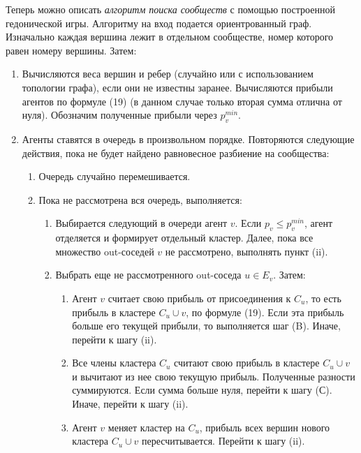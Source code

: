 Теперь можно описать \textit{алгоритм поиска сообществ} с помощью построенной гедонической игры. Алгоритму на вход подается ориентрованный граф. Изначально каждая вершина лежит в отдельном сообществе, номер которого равен номеру вершины. Затем:
\begin{enumerate}
	\item Вычисляются веса вершин и ребер (случайно или с использованием топологии графа), если они не известны заранее. Вычисляются прибыли агентов по формуле (19) (в данном случае только вторая сумма отлична от нуля). Обозначим полученные прибыли через $p_v^{min}$.
	
	\item Агенты ставятся в очередь в произвольном порядке. Повторяются следующие действия, пока не будет найдено равновесное разбиение на сообщества:
	
	\begin{enumerate}
		\item Очередь случайно перемешивается. 
		\item Пока не рассмотрена вся очередь, выполняется:
		
		\begin{enumerate}
			\item Выбирается следующий в очереди агент $v$. Если $p_v \leq p_v^{min}$, агент отделяется и формирует отдельный кластер. Далее, пока все множество out-соседей $v$ не рассмотрено, выполнять пункт (ii).
			\item Выбрать еще не рассмотренного out-соседа $u\in E_v$. Затем:
		
			\begin{enumerate}
				\item Агент $v$ считает свою прибыль от присоединения к $C_u$, то есть прибыль в кластере $C_u\cup v$, по формуле (19). Если эта прибыль больше его текущей прибыли, то выполняется шаг (B). Иначе, перейти к шагу (ii).
				\item Все члены кластера $C_u$ считают свою прибыль в кластере $C_u\cup v$ и вычитают из нее свою текущую прибыль. Полученные разности суммируются. Если сумма больше нуля, перейти к шагу (С). Иначе, перейти к шагу (ii).
				\item Агент $v$ меняет кластер на $C_u$, прибыль всех вершин нового кластера $C_u\cup v$ пересчитывается. Перейти к шагу (ii).
			\end{enumerate}
		\end{enumerate}
	\end{enumerate} 
\end{enumerate}

